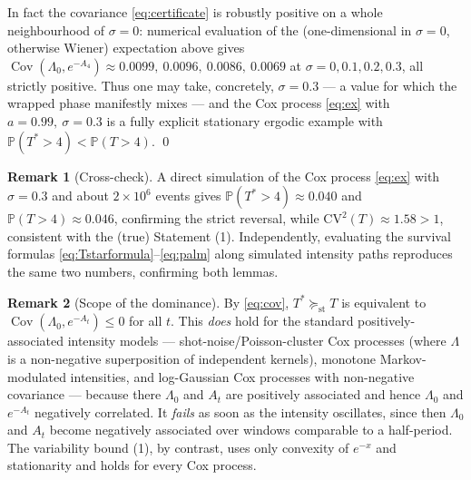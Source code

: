 \documentclass{amsart}
\theoremstyle{plain}
\theoremstyle{definition}
\newtheorem{remark}{Remark}
\newcommand{\Prob}{\mathbb{P}}
\newcommand{\Lam}{\Lambda}
\DeclareMathOperator{\Cov}{Cov}
\begin{document}
In fact the covariance \eqref{eq:certificate} is robustly positive on a whole
neighbourhood of $\sigma=0$: numerical evaluation of the (one-dimensional in $\sigma=0$,
otherwise Wiener) expectation above gives
$\Cov(\Lam_0,e^{-A_4})\approx 0.0099,\ 0.0096,\ 0.0086,\ 0.0069$ at
$\sigma=0,0.1,0.2,0.3$, all strictly positive. Thus one may take, concretely,
$\sigma=0.3$ — a value for which the wrapped phase manifestly mixes — and the
Cox process \eqref{eq:ex} with $a=0.99,\ \sigma=0.3$ is a fully explicit stationary
ergodic example with $\Prob(T^\ast>4)<\Prob(T>4)$. \qed

\begin{remark}[Cross-check]
A direct simulation of the Cox process \eqref{eq:ex} with $\sigma=0.3$ and about
$2\times10^6$ events gives $\Prob(T^\ast>4)\approx0.040$ and $\Prob(T>4)\approx0.046$,
confirming the strict reversal, while $\mathrm{CV}^2(T)\approx1.58>1$, consistent with
the (true) Statement (1). Independently, evaluating the survival formulas
\eqref{eq:Tstarformula}--\eqref{eq:palm} along simulated intensity paths reproduces the
same two numbers, confirming both lemmas.
\end{remark}

\begin{remark}[Scope of the dominance]
By \eqref{eq:cov}, $T^\ast\succeq_{\mathrm{st}}T$ is equivalent to
$\Cov(\Lam_0,e^{-A_t})\le0$ for all $t$. This \emph{does} hold for the standard
positively-associated intensity models — shot-noise/Poisson-cluster Cox processes
(where $\Lam$ is a non-negative superposition of independent kernels), monotone
Markov-modulated intensities, and log-Gaussian Cox processes with non-negative
covariance — because there $\Lam_0$ and $A_t$ are positively associated and hence
$\Lam_0$ and $e^{-A_t}$ negatively correlated. It \emph{fails} as soon as the intensity
oscillates, since then $\Lam_0$ and $A_t$ become negatively associated over windows
comparable to a half-period. The variability bound (1), by contrast, uses only
convexity of $e^{-x}$ and stationarity and holds for every Cox process.
\end{remark}
\end{document}
